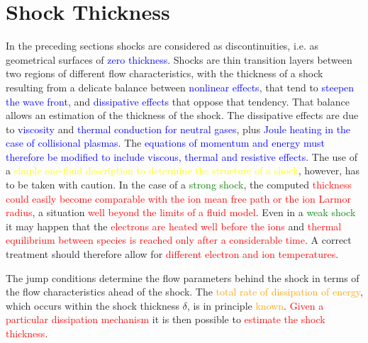 \documentclass[12pt,a4paper]{article}
\begin{document}
\section{Shock Thickness}
\cite{2015bps..book.....C} In the preceding sections shocks are considered as discontinuities, i.e. as geometrical surfaces of \textcolor{blue}{zero thickness}. Shocks are thin transition layers between two regions of different flow characteristics, with the thickness of a shock resulting from a delicate balance between \textcolor{blue}{nonlinear effects}, that tend to \textcolor{blue}{steepen the wave front}, and \textcolor{blue}{dissipative effects} that oppose that tendency. That balance allows an estimation of the thickness of the shock. The dissipative effects are due to \textcolor{blue}{viscosity} and \textcolor{blue}{thermal conduction for neutral gases}, plus \textcolor{blue}{Joule heating in the case of collisional plasmas}. The \textcolor{blue}{equations of momentum and energy must therefore be modified to include viscous, thermal and resistive effects}. The use of a \textcolor{yellow}{simple one-fluid description to determine the structure of a shock}, however, has to be taken with caution. In the case of a \textcolor{green}{strong shock}, the computed \textcolor{red}{thickness could easily become comparable with the ion mean free path or the ion Larmor radius}, a situation \textcolor{red}{well beyond the limits of a fluid model}. Even in a \textcolor{green}{weak shock} it may happen that the \textcolor{red}{electrons are heated well before the ions} and \textcolor{red}{thermal equilibrium between species is reached only after a considerable time}. A correct treatment should therefore allow for \textcolor{red}{different electron and ion temperatures}. 

The jump conditions determine the flow parameters behind the shock in terms of the flow characteristics ahead of the shock. The \textcolor{orange}{total rate of dissipation of energy}, which occurs within the shock thickness $\delta$, is in principle \textcolor{orange}{known}. \textcolor{red}{Given a particular dissipation mechanism} it is then possible to \textcolor{red}{estimate the shock thickness}.
\end{document}
